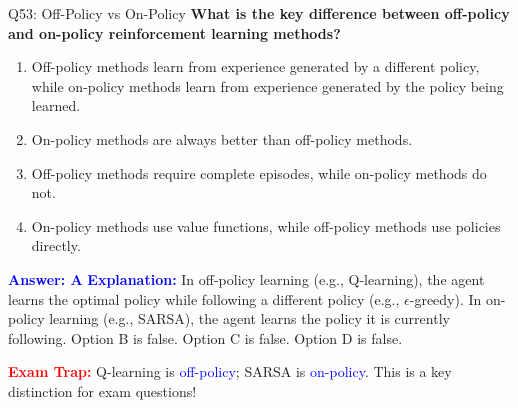 \documentclass[8pt]{beamer}
\begin{document}
	\begin{frame}{Q53: Off-Policy vs On-Policy}
		\fontsize{6.5}{7.5}\selectfont
		\textbf{What is the key difference between off-policy and on-policy reinforcement learning methods?}
		
		\begin{enumerate}
			\item Off-policy methods learn from experience generated by a different policy, while on-policy methods learn from experience generated by the policy being learned.
			\item On-policy methods are always better than off-policy methods.
			\item Off-policy methods require complete episodes, while on-policy methods do not.
			\item On-policy methods use value functions, while off-policy methods use policies directly.
		\end{enumerate}
		
		\vspace{0.1cm}
		\textcolor{blue}{\textbf{Answer: A}}
		\vspace{0.1cm}
		\textcolor{blue}{\textbf{Explanation:}} In off-policy learning (e.g., Q-learning), the agent learns the optimal policy while following a different policy (e.g., $\epsilon$-greedy). In on-policy learning (e.g., SARSA), the agent learns the policy it is currently following. Option B is false. Option C is false. Option D is false.
		
		\textcolor{red}{\textbf{Exam Trap:}} Q-learning is \textcolor{blue}{off-policy}; SARSA is \textcolor{blue}{on-policy}. This is a key distinction for exam questions!
	\end{frame}
	
\end{document}
